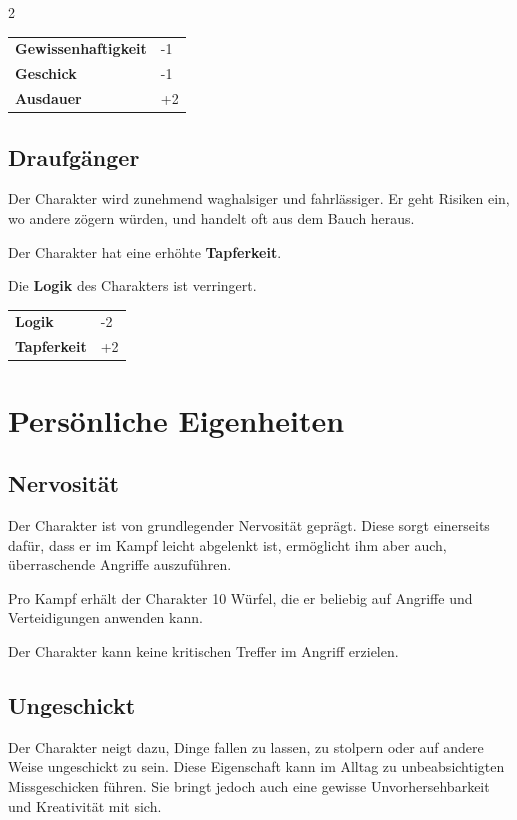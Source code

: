 \begin{multicols}{2}
    \begin{tabular}{@{}ll@{}}
        \textbf{Gewissenhaftigkeit} & -1\\
        \textbf{Geschick} & -1\\
        \textbf{Ausdauer} & +2\\
    \end{tabular}

    \subsection*{Draufgänger}

    Der Charakter wird zunehmend waghalsiger und fahrlässiger. Er geht Risiken ein, wo andere zögern würden, und handelt oft aus dem Bauch heraus.

    Der Charakter hat eine erhöhte \textbf{Tapferkeit}.

    Die \textbf{Logik} des Charakters ist verringert.

    \begin{tabular}{@{}ll@{}}
        \textbf{Logik} & -2\\
        \textbf{Tapferkeit} & +2\\
    \end{tabular}

    \section{Persönliche Eigenheiten}

    \subsection*{Nervosität}

    Der Charakter ist von grundlegender Nervosität geprägt. Diese sorgt einerseits dafür, dass er im Kampf leicht abgelenkt ist, ermöglicht ihm aber auch, überraschende Angriffe auszuführen.

    Pro Kampf erhält der Charakter 10 Würfel, die er beliebig auf Angriffe und Verteidigungen anwenden kann.

    Der Charakter kann keine kritischen Treffer im Angriff erzielen.


    \subsection*{Ungeschickt}

    Der Charakter neigt dazu, Dinge fallen zu lassen, zu stolpern oder auf andere Weise ungeschickt zu sein. Diese Eigenschaft kann im Alltag zu unbeabsichtigten Missgeschicken führen. Sie bringt jedoch auch eine gewisse Unvorhersehbarkeit und Kreativität mit sich.


\end{multicols}
